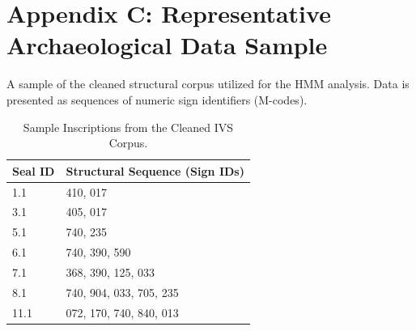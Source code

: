 \section{Appendix C: Representative Archaeological Data Sample}
A sample of the cleaned structural corpus utilized for the HMM analysis. Data is presented as sequences of numeric sign identifiers (M-codes).

\begin{table}[h]
\centering
\begin{tabular}{ll} \toprule
\textbf{Seal ID} & \textbf{Structural Sequence (Sign IDs)} \\ \midrule
1.1 & 410, 017 \\
3.1 & 405, 017 \\
5.1 & 740, 235 \\
6.1 & 740, 390, 590 \\
7.1 & 368, 390, 125, 033 \\
8.1 & 740, 904, 033, 705, 235 \\
11.1 & 072, 170, 740, 840, 013 \\ \bottomrule
\end{tabular}
\caption{Sample Inscriptions from the Cleaned IVS Corpus.}
\end{table}
